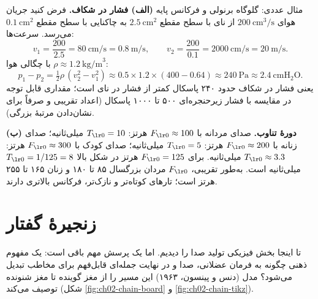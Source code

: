 \label{fig:ch02-glottal}

\begin{addedbox}{مثال عددی: گلوگاه برنولی و فرکانس پایه}
\textbf{(الف) فشار در شکاف.} فرض کنید جریان هوای $200\ \text{cm}^3/\text{s}$ از نای با سطح مقطع $2.5\ \text{cm}^2$ به چاکنایی با سطح مقطع $0.1\ \text{cm}^2$ می‌رسد. سرعت‌ها:
\[
v_1=\frac{200}{2.5}=80\ \text{cm/s}=0.8\ \text{m/s},\qquad v_2=\frac{200}{0.1}=2000\ \text{cm/s}=20\ \text{m/s}.
\]
با چگالی هوا $\rho \approx 1.2\ \text{kg/m}^3$:
\[
p_1 - p_2 = \tfrac12 \rho \,(v_2^2 - v_1^2) \approx 0.5 \times 1.2 \times (400 - 0.64) \approx 240\ \text{Pa} \approx 2.4\ \text{cmH}_2\text{O}.
\]
یعنی فشار در شکاف حدود ۲۴۰ پاسکال کمتر از فشار در نای است؛ مقداری قابل توجه در مقایسه با فشار زیرحنجره‌ای ۵۰۰ تا ۱۰۰۰ پاسکال (اعداد تقریبی و صرفاً برای نشان‌دادن مرتبهٔ بزرگی).

\textbf{(ب) دورهٔ تناوب.} صدای مردانه با $\chtwoFz  \approx 100$ هرتز: $\chtwoTz  = 10$ میلی‌ثانیه؛ صدای زنانه با $\chtwoFz  \approx 200$ هرتز: $\chtwoTz  = 5$ میلی‌ثانیه؛ صدای کودک با $\chtwoFz  \approx 300$ هرتز: $\chtwoTz  \approx 3.3$ میلی‌ثانیه. برای $\chtwoFz  = 125$ هرتز در شکل بالا $\chtwoTz  = 1/125 = 8$ میلی‌ثانیه است. به‌طور تقریبی، $\chtwoFz $ مردان بزرگسال ۸۵ تا ۱۸۰ و زنان ۱۶۵ تا ۲۵۵ هرتز است؛ تارهای کوتاه‌تر و نازک‌تر، فرکانس بالاتری دارند.
\end{addedbox}

\section{زنجیرهٔ گفتار}

تا اینجا بخش فیزیکی تولید صدا را دیدیم. اما یک پرسش مهم باقی است: یک مفهوم ذهنی چگونه به فرمان عضلانی، صدا و در نهایت جمله‌ای قابل‌فهم برای مخاطب تبدیل می‌شود؟ مدل  (دنس و پینسون، ۱۹۶۳) این مسیر را از مغز گوینده تا مغز شنونده توصیف می‌کند (شکل \ref{fig:ch02-chain-board} و \ref{fig:ch02-chain-tikz}).

\label{fig:ch02-chain-board}

